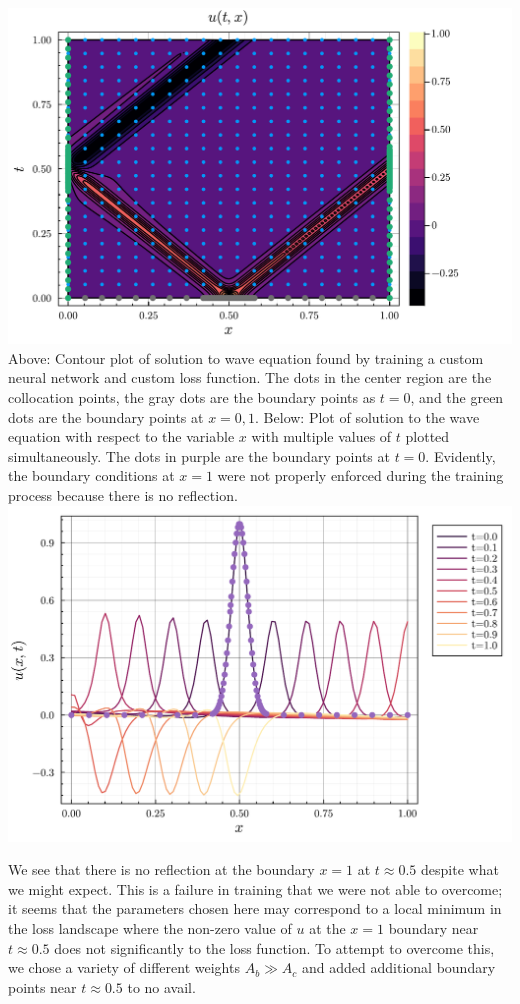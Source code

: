 \documentclass[11pt]{article}
\newcommand{\1}{\mathbf 1}
\begin{document}
\begin{center}
	\includegraphics[width=0.9\linewidth]{fig/custom_wave_eq_contour.pdf}
	\\
	Above: Contour plot of solution to wave equation found by training a custom neural network and custom loss function.
	The dots in the center region are the collocation points, the gray dots are the boundary points as $t = 0$, and the green dots are the boundary points at $x = 0,1$.
	Below:
	Plot of solution to the wave equation with respect to the variable $x$ with multiple values of $t$ plotted simultaneously.
	The dots in purple are the boundary points at $t = 0$.
	Evidently, the boundary conditions at $x = 1$ were not properly enforced during the training process because there is no reflection.
	\\
	\includegraphics[width=0.9\linewidth]{fig/custom_wave_eq_x.pdf}
\end{center}
We see that there is no reflection at the boundary $x = 1$ at $t \approx 0.5$ despite what we might expect.
This is a failure in training that we were not able to overcome; it seems that the parameters chosen here may correspond to a local minimum in the loss landscape where the non-zero value of $u$ at the $x = 1$ boundary near $t \approx 0.5$ does not significantly to the loss function.
To attempt to overcome this, we chose a variety of different weights $A_b \gg A_c$ and added additional boundary points near $t \approx 0.5$ to no avail.
\end{document}
